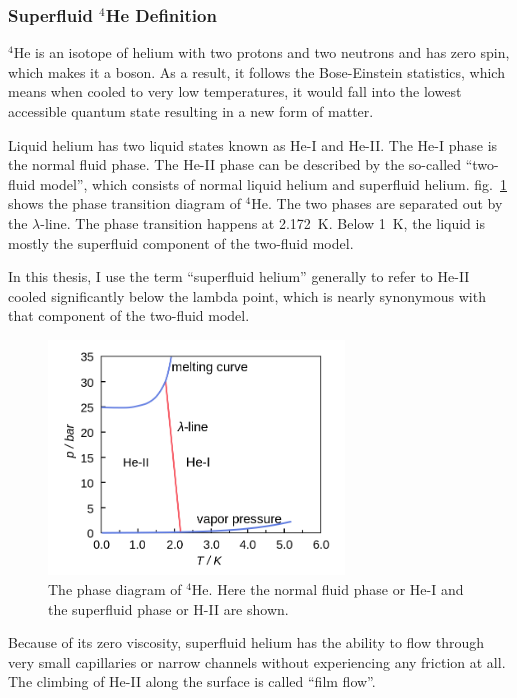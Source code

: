 \subsubsection{Superfluid $^4$He Definition}

$^4$He is an isotope of helium with two protons and two neutrons and
has zero spin, which makes it a boson. As a result, it follows the
Bose-Einstein statistics, which means when cooled to very low
temperatures, it would fall into the lowest accessible quantum state
resulting in a new form of matter.

Liquid helium has two liquid states known as He-I and He-II. The He-I
phase is the normal fluid phase. The He-II phase can be described by
the so-called ``two-fluid model'', which consists of normal liquid
helium and superfluid helium.
fig.~\ref{fig:phasetransition} shows the phase transition diagram of
$^4$He. The two phases are separated out by the $\lambda$-line. The
phase transition happens at 2.172~K. Below 1~K, the liquid is mostly
the superfluid component of the two-fluid model.

In this thesis, I use the term ``superfluid helium'' generally to
refer to He-II cooled significantly below the lambda point, which is
nearly synonymous with that component of the two-fluid model.

\begin{figure}[h!]
  \centering \includegraphics[width=0.7\textwidth]{phasetransition.png}
  \caption[Phase diagram of $^4$He]{The phase diagram of $^4$He. Here
    the normal fluid phase or He-I and the superfluid phase or H-II
    are shown.}
\label{fig:phasetransition}
\end{figure}

Because of its zero viscosity, superfluid helium has the ability to
flow through very small capillaries or narrow channels without
experiencing any friction at all. The climbing of He-II along the
surface is called ``film flow''.


